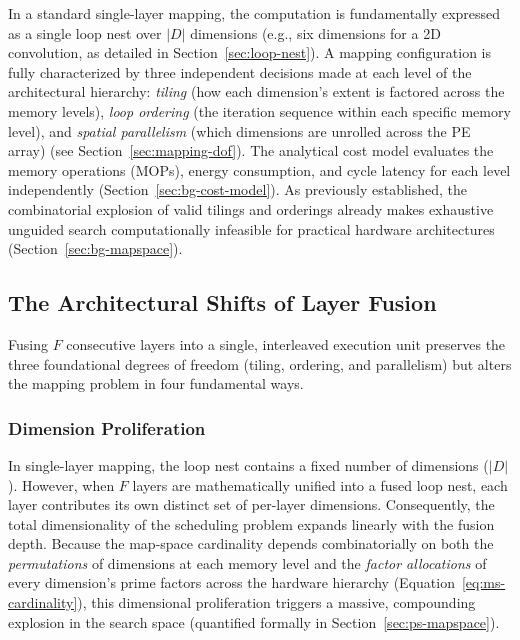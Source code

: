 In a standard single-layer mapping, the computation is fundamentally expressed as a single loop nest over $|D|$ dimensions (e.g., six dimensions for a 2D convolution, as detailed in Section~\ref{sec:loop-nest}). A mapping configuration is fully characterized by three independent decisions made at each level of the architectural hierarchy: \emph{tiling} (how each dimension's extent is factored across the memory levels), \emph{loop ordering} (the iteration sequence within each specific memory level), and \emph{spatial parallelism} (which dimensions are unrolled across the PE array) (see Section~\ref{sec:mapping-dof}). 
The analytical cost model evaluates the memory operations (MOPs), energy consumption, and cycle latency for each level independently (Section~\ref{sec:bg-cost-model}). As previously established, the combinatorial explosion of valid tilings and orderings already makes exhaustive unguided search computationally infeasible for practical hardware architectures (Section~\ref{sec:bg-mapspace}).

\subsection{The Architectural Shifts of Layer Fusion}
\label{sec:fds-what-changes}

Fusing $F$ consecutive layers into a single, interleaved execution unit preserves the three foundational degrees of freedom (tiling, ordering, and parallelism) but alters the mapping problem in four fundamental ways. 

\subsubsection{Dimension Proliferation}
\label{sec:fds-dim-proliferation}

In single-layer mapping, the loop nest contains a fixed number of dimensions ($|D|$). However, when $F$ layers are mathematically unified into a fused loop nest, each layer contributes its own distinct set of per-layer dimensions. Consequently, the total dimensionality of the scheduling problem expands linearly with the fusion depth. Because the map-space cardinality depends combinatorially on both the \emph{permutations} of dimensions at each memory level and the \emph{factor allocations} of every dimension's prime factors across the hardware hierarchy (Equation~\ref{eq:ms-cardinality}), this dimensional proliferation triggers a massive, compounding explosion in the search space (quantified formally in Section~\ref{sec:ps-mapspace}).

